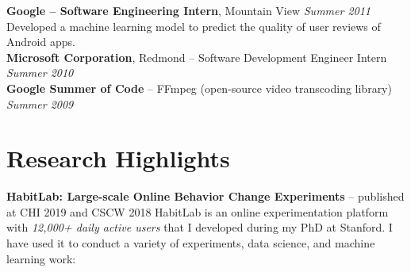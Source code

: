 \documentclass[margin,line]{resume}
\begin{document}
\begin{resume}
\textbf{Google -- Software Engineering Intern}, Mountain View \hfill \textsl{Summer 2011}\\
Developed a machine learning model to predict the quality of user reviews of Android apps.\\ %
\textbf{Microsoft Corporation}, Redmond -- Software Development Engineer Intern \hfill \textsl{Summer 2010}\\
\textbf{Google Summer of Code} -- FFmpeg (open-source video transcoding library) \hfill \textsl{Summer 2009}\\



\vspace{-4mm}

\section{\mysidestyle Research Highlights}

\textbf{HabitLab: Large-scale Online Behavior Change Experiments} -- published at CHI 2019 and CSCW 2018
HabitLab is an online experimentation platform with \emph{12,000+ daily active users} that I developed during my PhD at Stanford. I have used it to conduct a variety of experiments, data science, and machine learning work:


\end{resume}
\end{document}
